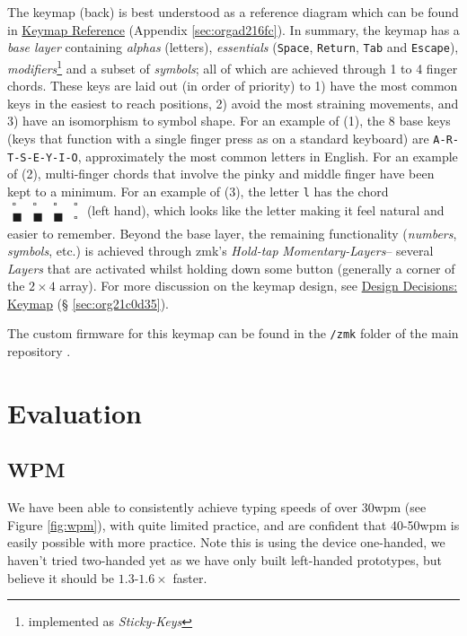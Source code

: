 \documentclass[logo,bsc,singlespacing,parskip]{infthesis}
\begin{document}
The keymap (back) is best understood as a reference diagram which can be found in
\hyperref[sec:orgad216fc]{Keymap Reference} (Appendix \ref{sec:orgad216fc}).
In summary, the keymap has a \emph{base layer} containing \emph{alphas} (letters), \emph{essentials} (\texttt{Space}, \texttt{Return}, \texttt{Tab} and \texttt{Escape}), \emph{modifiers}\footnote{implemented as \emph{Sticky-Keys}} and a subset of \emph{symbols}; all of which are achieved through 1 to 4 finger chords.
These keys are laid out (in order of priority) to 1) have the most common keys in the easiest to reach positions, 2) avoid the most straining movements, and 3) have an isomorphism to symbol shape.
For an example of (1), the 8 base keys (keys that function with a single finger press as on a standard keyboard) are  \texttt{A-R-T-S-E-Y-I-O}, approximately the most common letters in English.
For an example of (2), multi-finger chords that involve the pinky and middle finger have been kept to a minimum.
For an example of (3), the letter \texttt{l} has the chord \(\begin{matrix} \square & \square  & \square  & \square \\ \blacksquare &  \blacksquare & \blacksquare & \square \end{matrix}\) (left hand), which looks like the letter making it feel natural and easier to remember.
Beyond the base layer, the remaining functionality (\emph{numbers}, \emph{symbols}, etc.) is achieved through zmk's \autocite{ZMKFirmware}  \emph{Hold-tap} \emph{Momentary-Layers}-- several \emph{Layers} that are activated whilst holding down some button (generally a corner of the \(2\times4\) array).
For more discussion on the keymap design, see \hyperref[sec:org21c0d35]{Design Decisions: Keymap} (§ \ref{sec:org21c0d35}).

The custom firmware for this keymap can be found in the \texttt{/zmk} folder of the main repository \autocite{sharpNazzacodeHCIDMy}.
\section{Evaluation}
\label{sec:org9cc0b4f}
\subsection{WPM}
\label{sec:orgb699f57}
We have been able to consistently achieve typing speeds of over 30wpm (see Figure \ref{fig:wpm}), with quite limited practice, and are confident that 40-50wpm is easily possible with more practice.
Note this is using the device one-handed, we haven't tried two-handed yet as we have only built left-handed prototypes, but believe it should be \(1.3\)-\(1.6\times\) faster.
\end{document}

